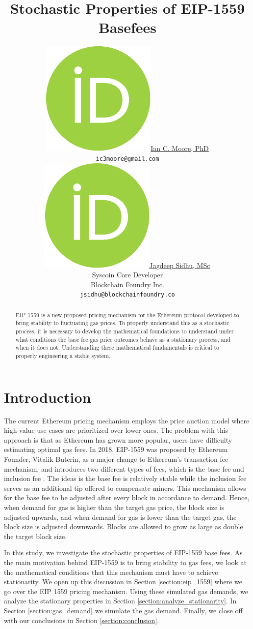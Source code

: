 \documentclass{article}
\title{Stochastic Properties of EIP-1559 Basefees}
\author{ \href{https://orcid.org/0000-0000-0000-0000}{\includegraphics[scale=0.06]{orcid.pdf}\hspace{1mm}Ian C. Moore, PhD}\\
	\texttt{ic3moore@gmail.com} \\
	\And
	\href{https://orcid.org/0000-0000-0000-0000}{\includegraphics[scale=0.06]{orcid.pdf}\hspace{1mm}Jagdeep Sidhu, MSc} \\
	Syscoin Core Developer\\
	Blockchain Foundry Inc.\\
	\texttt{jsidhu@blockchainfoundry.co} \\
}
\begin{document}
\maketitle

\begin{abstract}
EIP-1559 is a new proposed pricing mechanism for the Ethereum protocol developed to bring stability to fluctuating gas prices. To properly understand this as a stochastic process, it is necessary to develop the mathematical foundations to understand under what conditions the base fee gas price outcomes behave as a stationary process, and when it does not. Understanding these mathematical fundamentals is critical to properly engineering a stable system.
\end{abstract}




\section{Introduction}
The current Ethereum pricing mechanism employs the price auction model where high-value use cases are prioritized over lower ones. The problem with this approach is that as Ethereum has grown more popular, users have difficulty estimating optimal gas fees. In 2018, EIP-1559 was  proposed by Ethereum Founder, Vitalik Buterin, as a major change to Ethereum's transaction fee mechanism, and introduces two different types of fees, which is the base fee and inclusion fee \cite{But19}. The ideas is the base fee is relatively stable while the inclusion fee serves as an additional tip offered to compensate miners. This mechanism allows for the base fee to be adjusted after every block in accordance to demand. Hence, when demand for gas is higher than the target gas price, the block size is adjusted upwards, and when demand for gas is lower than the target gas, the block size is adjusted downwards. Blocks are allowed to grow as large as double the target block size.

In this study, we investigate the stochastic properties of EIP-1559 base fees. As the main motivation behind EIP-1559 is to bring stability to gas fees, we look at the mathematical conditions that this mechanism must have to achieve stationarity. We open up this discussion in Section \ref{section:eip_1559} where we go over the EIP 1559 pricing mechanism. Using these simulated gas demands, we analyze the stationary properties in Section \ref{section:analyze_stationarity}. In Section \ref{section:gas_demand} we simulate the gas demand.  Finally, we close off with our conclusions in Section \ref{section:conclusion}.
\end{document}
